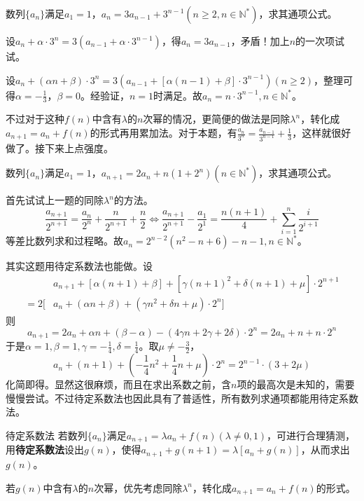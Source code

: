 \documentclass[../sample]{subfiles}
\begin{document}
\begin{problem}
  数列$\{a_n\}$满足$a_1=1$，$a_{n}=3a_{n-1}+3^{n-1}(n\geq 2, n\in\mathbb{N^*})$，求其通项公式。
\end{problem}

设$a_n+\alpha·3^n=3(a_{n-1}+\alpha·3^{n-1})$，得$a_n=3a_{n-1}$，矛盾！加上$n$的一次项试试。

设$a_n+(\alpha n+\beta)·3^n=3(a_{n-1}+[\alpha(n-1)+\beta]·3^{n-1})(n\geq 2)$，整理可得$\alpha=-\frac{1}{3}$，$\beta=0$。经验证，$n=1$时满足。故$a_n=n·3^{n-1}, n\in\mathbb{N^*}$。

不过对于这种$f(n)$中含有$\lambda$的$n$次幂的情况，更简便的做法是同除$\lambda^n$，转化成$a_{n+1}=a_{n}+f(n)$的形式再用累加法。对于本题，有$\frac{a_n}{3^n}=\frac{a_{n-1}}{3^{n-1}}+\frac{1}{3}$，这样就很好做了。接下来上点强度。

\begin{problem}
  数列$\{a_n\}$满足$a_1=1$，$a_{n+1}=2a_{n}+n(1+2^n)(n\in\mathbb{N^*})$，求其通项公式。
\end{problem}

首先试试上一题的同除$\lambda^n$的方法。
\[\frac{a_{n+1}}{2^{n+1}}=\frac{a_n}{2^n}+\frac{n}{2^{n+1}}+\frac{n}{2}\Leftrightarrow \frac{a_{n+1}}{2^{n+1}}-\frac{a_1}{2^1}=\frac{n(n+1)}{4}+\sum_{i=1}^{n}\frac{i}{2^{i+1}}\]
等差比数列求和过程略。故$a_n=2^{n-2}(n^2-n+6)-n-1, n\in\mathbb{N^*}$。

其实这题用待定系数法也能做。设\[\begin{aligned}
  &a_{n+1}+[\alpha (n+1)+\beta]+[\gamma(n+1)^2+\delta(n+1)+\mu]·2^{n+1}\\
  =2[&a_n+(\alpha n+\beta)+(\gamma n^2+\delta n+\mu)·2^n]
\end{aligned}\]
则\[a_{n+1}=2a_n+\alpha n+(\beta-\alpha)-(4\gamma n+2\gamma +2\delta )·2^n=2a_n+n+n·2^n\]
于是$\alpha=1, \beta=1, \gamma=-\frac{1}{4}, \delta=\frac{1}{4}$。取$\mu\neq -\frac{3}{2}$，
\[a_n+(n+1)+(-\frac{1}{4}n^2+\frac{1}{4}n+\mu)·2^n=2^{n-1}·(3+2\mu)\]
化简即得。显然这很麻烦，而且在求出系数之前，含$n$项的最高次是未知的，需要慢慢尝试。不过待定系数法也因此具有了普适性，所有数列求通项都能用待定系数法。
\newpage
\begin{theorem}{待定系数法}
  若数列$\{a_n\}$满足$a_{n+1}=\lambda a_{n}+f(n)(\lambda\neq 0, 1)$，可进行合理猜测，用\textbf{待定系数法}设出$g(n)$，使得$a_{n+1}+g(n+1)=\lambda[a_n+g(n)]$，从而求出$g(n)$。

  若$g(n)$中含有$\lambda$的$n$次幂，优先考虑同除$\lambda^n$，转化成$a_{n+1}=a_{n}+f(n)$的形式。
\end{theorem}
\end{document}
